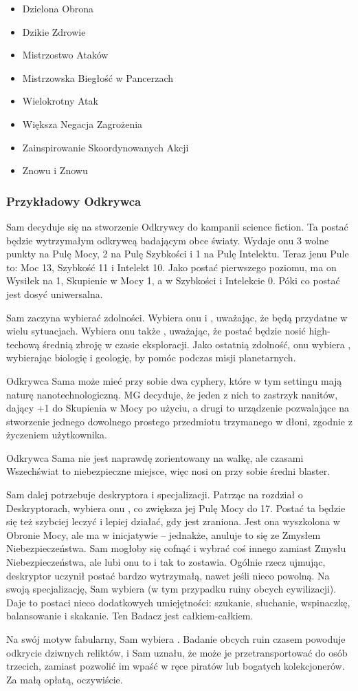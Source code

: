 \begin{itemize}
\item Dzielona Obrona
\item Dzikie Zdrowie
\item Mistrzostwo Ataków
\item Mistrzowska Biegłość w Pancerzach
\item Wielokrotny Atak
\item Większa Negacja Zagrożenia
\item Zainspirowanie Skoordynowanych Akcji
\item Znowu i Znowu
\end{itemize}

\subsubsection{Przykładowy Odkrywca}

Sam decyduje się na stworzenie Odkrywcy do kampanii science fiction. Ta postać będzie wytrzymałym odkrywcą badającym obce światy. Wydaje onu 3 wolne punkty na Pulę Mocy, 2 na Pulę Szybkości i 1 na Pulę Intelektu. Teraz jenu Pule to: Moc 13, Szybkość 11 i Intelekt 10. Jako postać pierwszego poziomu, ma on Wysiłek na 1, Skupienie w Mocy 1, a w Szybkości i Intelekcie 0. Póki co postać jest dosyć uniwersalna.

Sam zaczyna wybierać zdolności. Wybiera onu  i , uważając, że będą przydatne w wielu sytuacjach. Wybiera onu także , uważając, że postać będzie nosić high-techową średnią zbroję w czasie eksploracji. Jako ostatnią zdolność, onu wybiera , wybierając biologię i geologię, by pomóc podczas misji planetarnych.

Odkrywca Sama może mieć przy sobie dwa cyphery, które w tym settingu mają naturę nanotechnologiczną. MG decyduje, że jeden z nich to zastrzyk nanitów, dający +1 do Skupienia w Mocy po użyciu, a drugi to urządzenie pozwalające na stworzenie jednego dowolnego prostego przedmiotu trzymanego w dłoni, zgodnie z życzeniem użytkownika. 

Odkrywca Sama nie jest naprawdę zorientowany na walkę, ale czasami Wszechświat to niebezpieczne miejsce, więc nosi on przy sobie średni blaster.

Sam dalej potrzebuje deskryptora i specjalizacji. Patrząc na rozdział o Deskryptorach, wybiera onu , co zwiększa jej Pulę Mocy do 17. Postać ta będzie się też szybciej leczyć i lepiej działać, gdy jest zraniona. Jest ona wyszkolona w Obronie Mocy, ale ma  w inicjatywie – jednakże, anuluje to się ze Zmysłem Niebezpieczeństwa. Sam mogłoby się cofnąć i wybrać coś innego zamiast Zmysłu Niebezpieczeństwa, ale lubi onu to i tak to zostawia. Ogólnie rzecz ujmując, deskryptor uczynił postać bardzo wytrzymałą, nawet jeśli nieco powolną. 
Na swoją specjalizację, Sam wybiera  (w tym przypadku ruiny obcych cywilizacji). Daje to postaci nieco dodatkowych umiejętności: szukanie, słuchanie, wspinaczkę, balansowanie i skakanie. Ten Badacz jest całkiem-całkiem.

Na swój motyw fabularny, Sam wybiera . Badanie obcych ruin czasem powoduje odkrycie dziwnych reliktów, i Sam uznału, że może je przetransportować do osób trzecich, zamiast pozwolić im wpaść w ręce piratów lub bogatych kolekcjonerów. Za małą opłatą, oczywiście. 

